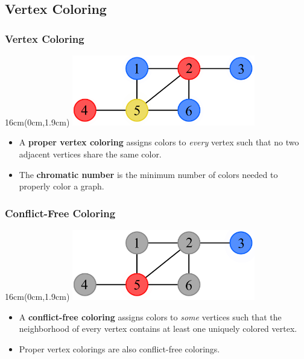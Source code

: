 \documentclass[xcolor=dvipsnames,aspectratio=1610]{beamer}
\newcommand{\exampleheight}{1.9cm}
\newcommand{\examplewidth}{16cm}
\begin{document}
  \subsection{Vertex Coloring}

  \begin{frame}
    \frametitle{Vertex Coloring}

    \begin{textblock*}{\examplewidth}(0cm,\exampleheight) %
      \centering
      \includegraphics[width=8cm]{../figures/example-vcp.pdf}
    \end{textblock*}

    \vspace{4.5cm}
    \vfill

    \begin{itemize}
      \item A \textbf{proper vertex coloring} assigns colors to \emph{every} vertex such that no two adjacent vertices share the same color.
      \pause
      \vfill
      \item The \textbf{chromatic number} is the minimum number of colors needed to properly color a graph.
    \end{itemize}
  \end{frame}

  \begin{frame}
    \frametitle{Conflict-Free Coloring}

    \begin{textblock*}{\examplewidth}(0cm,\exampleheight) %
      \centering
      \includegraphics[width=8cm]{../figures/example-cfcp.pdf}
    \end{textblock*}

    \vspace{4.5cm}
    \vfill

    \begin{itemize}
      \item<1-2> A \textbf{conflict-free coloring} assigns colors to \emph{some} vertices such that the neighborhood of every vertex contains at least one uniquely colored vertex.
      \vfill
      \pause
      \item<2> Proper vertex colorings are also conflict-free colorings.
    \end{itemize}
  \end{frame}
\end{document}
